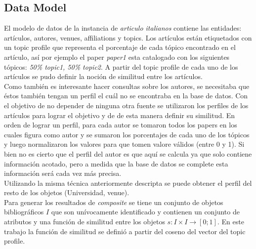 \subsection{Data Model}\label{body-data-model}
El modelo de datos de la instancia de \textit{articulo italianos} contiene las entidades: artículos, autores, venues, affiliations y topics. Los artículos están etiquetados con un topic profile que representa el porcentaje de cada tópico encontrado en el artículo, así por ejemplo el paper \textit{paper1} esta catalogado con los siguientes tópicos: \textit{50\% topic1, 50\% topic2}. A partir del topic profile de cada uno de los artículos se pudo definir la noción de similitud entre los artículos.\\
Como también es interesante hacer consultas sobre los autores, se necesitaba que éstos también tengan un perfil el cuál no se encontraba en la base de datos. Con el objetivo de no depender de ninguna otra fuente se utilizaron los perfiles de los artículos para lograr el objetivo y de de esta manera definir su similitud. En orden de lograr un perfil, para cada autor se tomaron todos los papers en los cuales figura como autor y se sumaron los porcentajes de cada uno de los tópicos y luego normalizaron los valores para que tomen valore válidos (entre 0 y 1). Si bien no es cierto que el perfil del autor es que aquí se calcula ya que solo contiene información acotado, pero a medida que la base de datos se complete esta información será cada vez más precisa.\\
Utilizando la misma técnica anteriormente descripta se puede obtener el perfil del resto de los objetos (Universidad, venue).\\
Para generar los resultados de \textit{composite} se tiene un conjunto de objetos bibliográficos $I$ que son unívocamente identificado y contienen un conjunto de atributos y una función de similitud entre los objetos $ s: I \times I \rightarrow [0;1]$. En este trabajo la función de similitud se definió a partir del coseno del vector del topic profile.\\
